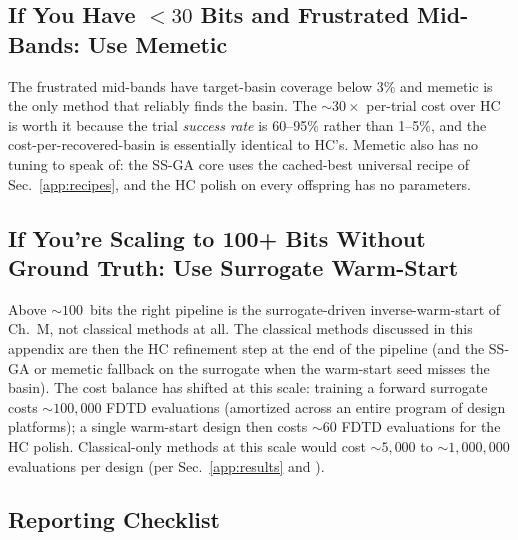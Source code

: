 \subsection{If You Have $<\!30$ Bits and Frustrated Mid-Bands: Use Memetic}

The frustrated mid-bands have target-basin coverage below 3\% and
memetic is the only method that reliably finds the basin. The
$\sim\!30\times$ per-trial cost over HC is worth it because the
trial \emph{success rate} is 60--95\% rather than 1--5\%, and the
cost-per-recovered-basin is essentially identical to HC's. Memetic
also has no tuning to speak of: the SS-GA core uses the
cached-best universal recipe of Sec.~\ref{app:recipes}, and the HC
polish on every offspring has no parameters.

\subsection{If You're Scaling to 100+ Bits Without Ground Truth: Use Surrogate Warm-Start}

Above $\sim\!100$~bits the right pipeline is the surrogate-driven
inverse-warm-start of Ch.~M, not classical methods at all. The
classical methods discussed in this appendix are then the HC
refinement step at the end of the pipeline (and the SS-GA or
memetic fallback on the surrogate when the warm-start seed misses
the basin). The cost balance has shifted at this scale: training a
forward surrogate costs $\sim\!100{,}000$ FDTD evaluations
(amortized across an entire program of design platforms); a single
warm-start design then costs $\sim\!60$ FDTD evaluations for the
HC polish. Classical-only methods at this scale would cost
$\sim\!5{,}000$ to $\sim\!1{,}000{,}000$ evaluations per design
(per Sec.~\ref{app:results} and \cite{Maloney2026Paper3}).

\subsection{Reporting Checklist}

